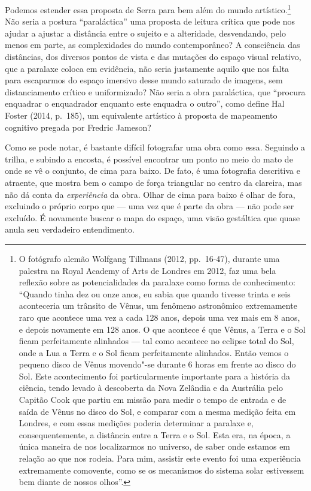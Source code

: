 Podemos estender essa proposta de Serra para bem além do mundo
artístico.\footnote{O fotógrafo alemão Wolfgang Tillmans (2012, pp.~16-47), durante uma
  palestra na Royal Academy of Arts de Londres em 2012, faz uma bela
  reflexão sobre as potencialidades da paralaxe como forma de
  conhecimento: ``Quando tinha dez ou onze anos, eu sabia que quando
  tivesse trinta e seis aconteceria um trânsito de Vênus, um fenômeno
  astronômico extremamente raro que acontece uma vez a cada 128 anos,
  depois uma vez mais em 8 anos, e depois novamente em 128 anos. O que
  acontece é que Vênus, a Terra e o Sol ficam perfeitamente alinhados ---
  tal como acontece no eclipse total do Sol, onde a Lua a Terra e o Sol
  ficam perfeitamente alinhados. Então vemos o pequeno disco de Vênus
  movendo"-se durante 6 horas em frente ao disco do Sol. Este
  acontecimento foi particularmente importante para a história da
  ciência, tendo levado à descoberta da Nova Zelândia e da Austrália
  pelo Capitão Cook que partiu em missão para medir o tempo de entrada e
  de saída de Vênus no disco do Sol, e comparar com a mesma medição
  feita em Londres, e com essas medições poderia determinar a paralaxe
  e, consequentemente, a distância entre a Terra e o Sol. Esta era, na
  época, a única maneira de nos localizarmos no universo, de saber onde
  estamos em relação ao que nos rodeia. Para mim, assistir este evento
  foi uma experiência extremamente comovente, como se os mecanismos do
  sistema solar estivessem bem diante de nossos olhos''.} Não
seria a postura ``paraláctica'' uma proposta de leitura crítica que pode
nos ajudar a ajustar a distância entre o sujeito e a alteridade,
desvendando, pelo menos em parte, as complexidades do mundo
contemporâneo? A consciência das distâncias, dos diversos pontos de
vista e das mutações do espaço visual relativo, que a paralaxe coloca em
evidência, não seria justamente aquilo que nos falta para escaparmos do
espaço imersivo desse mundo saturado de imagens, sem distanciamento
crítico e uniformizado? Não seria a obra paraláctica, que ``procura
enquadrar o enquadrador enquanto este enquadra o outro'', como define
Hal Foster (2014, p.~185), um equivalente artístico à proposta de
mapeamento cognitivo pregada por Fredric Jameson?

Como se pode notar, é bastante difícil fotografar uma obra como essa.
Seguindo a trilha, e subindo a encosta, é possível encontrar um ponto no
meio do mato de onde se vê o conjunto, de cima para baixo. De fato, é
uma fotografia descritiva e atraente, que mostra bem o campo de força
triangular no centro da clareira, mas não dá conta da \emph{experiência}
da obra. Olhar de cima para baixo é olhar de fora, excluindo o próprio
corpo que --- uma vez que é parte da obra --- não pode ser excluído. É
novamente buscar o mapa do espaço, uma visão gestáltica que quase anula
seu verdadeiro entendimento.


